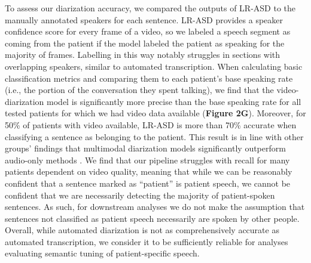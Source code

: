 \documentclass[pdflatex,sn-basic]{sn-jnl}%
\theoremstyle{thmstyleone}%
\theoremstyle{thmstyletwo}%
\theoremstyle{thmstylethree}%
\begin{document}
To assess our diarization accuracy, we compared the outputs of LR-ASD to the manually annotated speakers for each sentence. LR-ASD provides a speaker confidence score for every frame of a video, so we labeled a speech segment as coming from the patient if the model labeled the patient as speaking for the majority of frames. Labelling in this way notably struggles in sections with overlapping speakers, similar to automated transcription. When calculating basic classification metrics and comparing them to each patient's base speaking rate (i.e., the portion of the conversation they spent talking), we find that the video-diarization model is significantly more precise than the base speaking rate for all tested patients for which we had video data available (\textbf{Figure 2G}). Moreover, for 50\% of patients with video available, LR-ASD is more than 70\% accurate when classifying a sentence as belonging to the patient. This result is in line with other groups' findings that multimodal diarization models significantly outperform audio-only methods \citep{bib55,bib56}. We find that our pipeline struggles with recall for many patients dependent on video quality, meaning that while we can be reasonably confident that a sentence marked as ``patient'' is patient speech, we cannot be confident that we are necessarily detecting the majority of patient-spoken sentences. As such, for downstream analyses we do not make the assumption that sentences not classified as patient speech necessarily are spoken by other people. Overall, while automated diarization is not as comprehensively accurate as automated transcription, we consider it to be sufficiently reliable for analyses evaluating semantic tuning of patient-specific speech.

\clearpage
\end{document}
